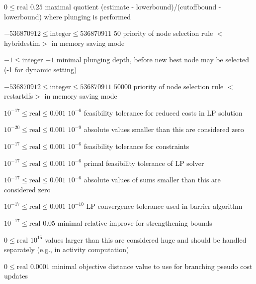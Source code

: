 %
{$0\leq\textrm{real}$}%
{$0.25$}%
{maximal quotient (estimate - lowerbound)/(cutoffbound - lowerbound) where plunging is performed}%
{}

%
{$-536870912\leq\textrm{integer}\leq536870911$}%
{$50$}%
{priority of node selection rule $<$hybridestim$>$ in memory saving mode}%
{}

%
{$-1\leq\textrm{integer}$}%
{$-1$}%
{minimal plunging depth, before new best node may be selected (-1 for dynamic setting)}%
{}

%
{$-536870912\leq\textrm{integer}\leq536870911$}%
{$50000$}%
{priority of node selection rule $<$restartdfs$>$ in memory saving mode}%
{}

%
{$10^{-17}\leq\textrm{real}\leq0.001$}%
{$10^{- 6}$}%
{feasibility tolerance for reduced costs in LP solution}%
{}

%
{$10^{-20}\leq\textrm{real}\leq0.001$}%
{$10^{- 9}$}%
{absolute values smaller than this are considered zero}%
{}

%
{$10^{-17}\leq\textrm{real}\leq0.001$}%
{$10^{- 6}$}%
{feasibility tolerance for constraints}%
{}

%
{$10^{-17}\leq\textrm{real}\leq0.001$}%
{$10^{- 6}$}%
{primal feasibility tolerance of LP solver}%
{}

%
{$10^{-17}\leq\textrm{real}\leq0.001$}%
{$10^{- 6}$}%
{absolute values of sums smaller than this are considered zero}%
{}

%
{$10^{-17}\leq\textrm{real}\leq0.001$}%
{$10^{-10}$}%
{LP convergence tolerance used in barrier algorithm}%
{}

%
{$10^{-17}\leq\textrm{real}$}%
{$0.05$}%
{minimal relative improve for strengthening bounds}%
{}

%
{$0\leq\textrm{real}$}%
{$10^{ 15}$}%
{values larger than this are considered huge and should be handled separately (e.g., in activity computation)}%
{}

%
{$0\leq\textrm{real}$}%
{$0.0001$}%
{minimal objective distance value to use for branching pseudo cost updates}%
{}


